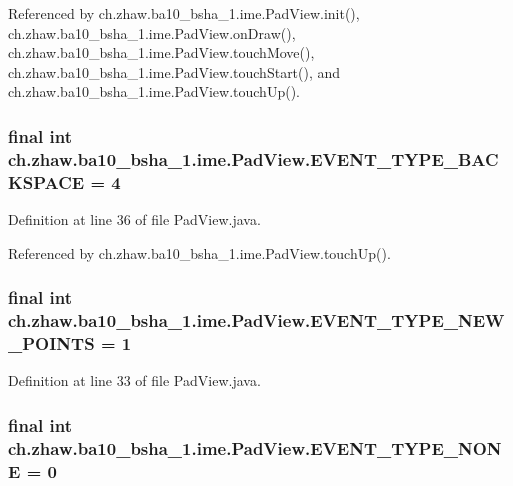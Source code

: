 Referenced by ch.zhaw.ba10\_\-bsha\_\-1.ime.PadView.init(), ch.zhaw.ba10\_\-bsha\_\-1.ime.PadView.onDraw(), ch.zhaw.ba10\_\-bsha\_\-1.ime.PadView.touchMove(), ch.zhaw.ba10\_\-bsha\_\-1.ime.PadView.touchStart(), and ch.zhaw.ba10\_\-bsha\_\-1.ime.PadView.touchUp().\hypertarget{classch_1_1zhaw_1_1ba10__bsha__1_1_1ime_1_1PadView_a1383a241ed874fd21ccfb9f661d34c5d}{
\subsubsection[{EVENT\_\-TYPE\_\-BACKSPACE}]{\setlength{\rightskip}{0pt plus 5cm}final int {\bf ch.zhaw.ba10\_\-bsha\_\-1.ime.PadView.EVENT\_\-TYPE\_\-BACKSPACE} = 4}}
\label{classch_1_1zhaw_1_1ba10__bsha__1_1_1ime_1_1PadView_a1383a241ed874fd21ccfb9f661d34c5d}


Definition at line 36 of file PadView.java.

Referenced by ch.zhaw.ba10\_\-bsha\_\-1.ime.PadView.touchUp().\hypertarget{classch_1_1zhaw_1_1ba10__bsha__1_1_1ime_1_1PadView_a25e2262d68474969ad4d9ddd4abf79a9}{
\subsubsection[{EVENT\_\-TYPE\_\-NEW\_\-POINTS}]{\setlength{\rightskip}{0pt plus 5cm}final int {\bf ch.zhaw.ba10\_\-bsha\_\-1.ime.PadView.EVENT\_\-TYPE\_\-NEW\_\-POINTS} = 1}}
\label{classch_1_1zhaw_1_1ba10__bsha__1_1_1ime_1_1PadView_a25e2262d68474969ad4d9ddd4abf79a9}


Definition at line 33 of file PadView.java.\hypertarget{classch_1_1zhaw_1_1ba10__bsha__1_1_1ime_1_1PadView_a125bdca474db5a2f392bd3036673abc2}{
\subsubsection[{EVENT\_\-TYPE\_\-NONE}]{\setlength{\rightskip}{0pt plus 5cm}final int {\bf ch.zhaw.ba10\_\-bsha\_\-1.ime.PadView.EVENT\_\-TYPE\_\-NONE} = 0}}
\label{classch_1_1zhaw_1_1ba10__bsha__1_1_1ime_1_1PadView_a125bdca474db5a2f392bd3036673abc2}


